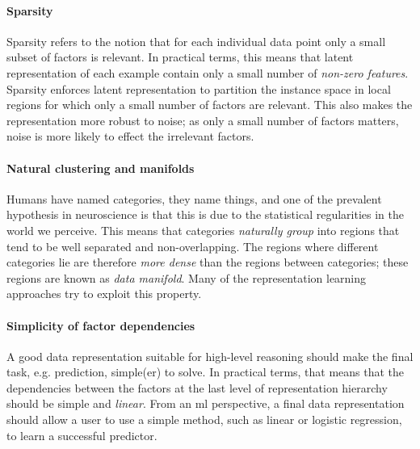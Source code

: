\paragraph{\textbf{Sparsity}}
Sparsity refers to the notion that for each individual data point only a small subset of factors is relevant.
In practical terms, this means that latent representation of each example contain only a small number of \textit{non-zero features}.
Sparsity enforces latent representation to partition the instance space in local regions for which only a small number of factors are relevant.
This also makes the representation more robust to noise; as only a small number of factors matters, noise is more likely to effect the irrelevant factors.




\paragraph{\textbf{Natural clustering and manifolds}}
Humans have named categories, they name things, and one of the prevalent hypothesis in neuroscience is that this is due to the statistical regularities in the world we perceive.
This means that categories \textit{naturally group} into regions that tend to be well separated and non-overlapping.
The regions where different categories lie are therefore \textit{more dense} than the regions between categories; these regions are known as \textit{data manifold}.
Many of the representation learning approaches try to exploit this property.





\paragraph{\textbf{Simplicity of factor dependencies}}
A good data representation suitable for high-level reasoning should make the final task, e.g. prediction, simple(er) to solve.
In practical terms, that means that the dependencies between the factors at the last level of representation hierarchy should be simple and \textit{linear}.
From an \gls{ml} perspective, a final data representation should allow a user to use a simple method, such as linear or logistic regression, to learn a successful predictor.












